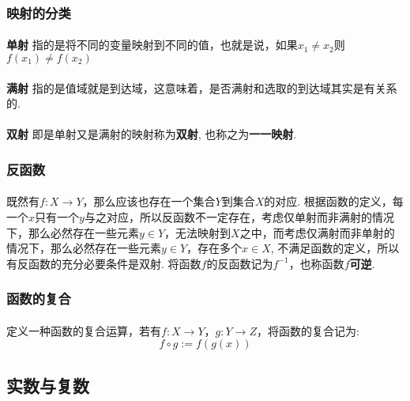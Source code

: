 \subsubsection{映射的分类}
\paragraph{}
\textbf{单射} \: 指的是将不同的变量映射到不同的值，也就是说，如果$x_1 \neq x_2$则$f(x_1) \neq f(x_2)$

\paragraph{}
\textbf{满射} \: 指的是值域就是到达域，这意味着，是否满射和选取的到达域其实是有关系的.

\paragraph{}
\textbf{双射} \:  即是单射又是满射的映射称为\textbf{双射}, 也称之为\textbf{一一映射}.

\subsubsection{反函数}
\paragraph{}
既然有$f: X \to Y$，那么应该也存在一个集合$Y$到集合$X$的对应. 根据函数的定义，每一个$x$只有一个$y$与之对应，所以反函数不一定存在，考虑仅单射而非满射的情况下，那么必然存在一些元素$y \in Y$，无法映射到$X$之中，而考虑仅满射而非单射的情况下，那么必然存在一些元素$y \in Y$，存在多个$x \in X$, 不满足函数的定义，所以有反函数的充分必要条件是双射.  将函数$f$的反函数记为$f^{-1}$，也称函数$f$\textbf{可逆}.

\subsubsection{函数的复合}
\paragraph{}
定义一种函数的复合运算，若有$f: X \to Y$，$g: Y \to Z$，将函数的复合记为:
$$
f \circ g := f(g(x))
$$

\subsection{实数与复数}

